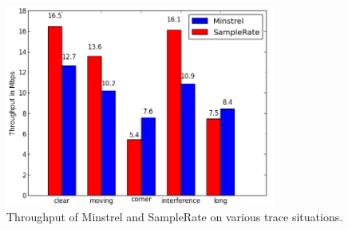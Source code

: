 \documentclass[letterpaper,twocolumn,10pt]{article}
\begin{document}
\begin{figure}[htb]
  \hspace{-.75em}\includegraphics[width=3.5in]{MinVSSam1.png}\vspace{-0.75em}
  \caption{Throughput of Minstrel and SampleRate on various trace situations.}
\label{figure:3}
\end{figure}
\end{document}
